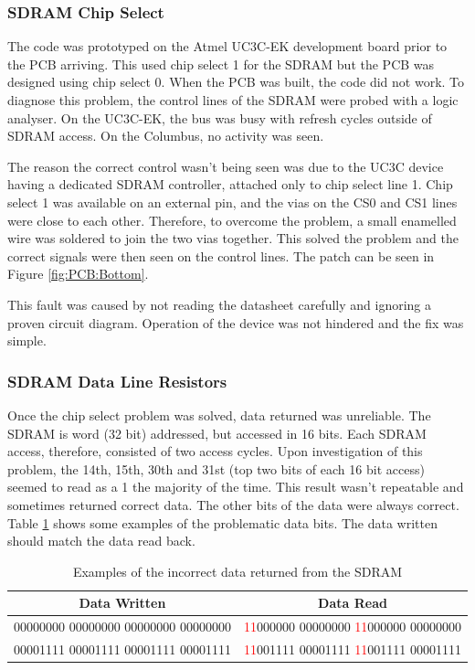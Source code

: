 
\subsubsection{SDRAM Chip Select}
The code was prototyped on the Atmel UC3C-EK development board prior to the PCB arriving. This used chip select 1 for the SDRAM but the PCB was designed using chip select 0. When the PCB was built, the code did not work. To diagnose this problem, the control lines of the SDRAM were probed with a logic analyser. On the UC3C-EK, the bus was busy with refresh cycles outside of SDRAM access. On the Columbus, no activity was seen. 

The reason the correct control wasn't being seen was due to the UC3C device having a dedicated SDRAM controller, attached only to chip select line 1. Chip select 1 was available on an external pin, and the vias on the CS0 and CS1 lines were close to each other. Therefore, to overcome the problem, a small enamelled wire was soldered to join the two vias together. This solved the problem and the correct signals were then seen on the control lines. The patch can be seen in Figure \ref{fig:PCB:Bottom}. 

This fault was caused by not reading the datasheet carefully and ignoring a proven circuit diagram. Operation of the device was not hindered and the fix was simple.

\subsubsection{SDRAM Data Line Resistors}
Once the chip select problem was solved, data returned was unreliable. The SDRAM is word (32 bit) addressed, but accessed in 16 bits. Each SDRAM access, therefore, consisted of two access cycles. 
Upon investigation of this problem, the 14th, 15th, 30th and 31st (top two bits of each 16 bit access) seemed to read as a 1 the majority of the time. This result wasn't repeatable and sometimes returned correct data. The other bits of the data were always correct. Table \ref{table:SDRAM_Err} shows some examples of the problematic data bits. The data written should match the data read back. 
\begin{table}[!ht]
\caption{Examples of the incorrect data returned from the SDRAM}
\label{table:SDRAM_Err}
\begin{tabular}{cc}\toprule
\textbf{Data Written}							&	\textbf{Data Read} \\ \toprule
00000000 00000000 00000000 00000000		&	\textcolor{red}{11}000000 00000000 \textcolor{red}{11}000000 00000000 \\\midrule
00001111 00001111 00001111 00001111		&	\textcolor{red}{11}001111 00001111 \textcolor{red}{11}001111 00001111 \\ \bottomrule
\end{tabular}
\end{table}

